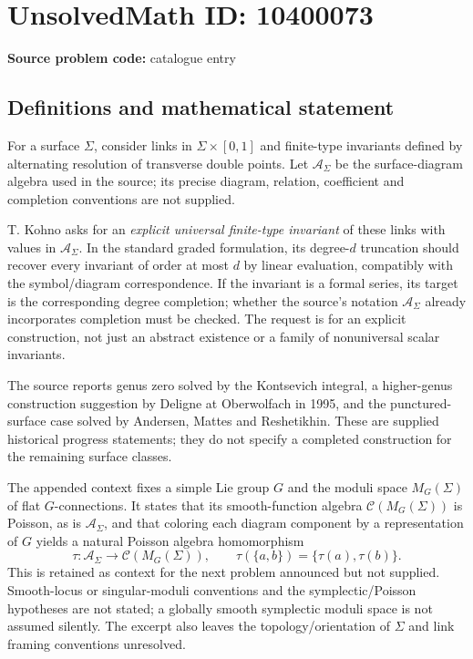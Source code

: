 \documentclass[11pt]{article}
\begin{document}
\section*{UnsolvedMath ID: 10400073}
\textbf{Source problem code:} catalogue entry
\subsection{Definitions and mathematical statement}
For a surface \(\Sigma\), consider links in \(\Sigma\times[0,1]\) and finite-type invariants defined by alternating resolution of transverse double points. Let \(\mathcal A_\Sigma\) be the surface-diagram algebra used in the source; its precise diagram, relation, coefficient and completion conventions are not supplied.

T. Kohno asks for an \emph{explicit universal finite-type invariant} of these links with values in \(\mathcal A_\Sigma\). In the standard graded formulation, its degree-\(d\) truncation should recover every invariant of order at most \(d\) by linear evaluation, compatibly with the symbol/diagram correspondence. If the invariant is a formal series, its target is the corresponding degree completion; whether the source's notation \(\mathcal A_\Sigma\) already incorporates completion must be checked. The request is for an explicit construction, not just an abstract existence or a family of nonuniversal scalar invariants.

The source reports genus zero solved by the Kontsevich integral, a higher-genus construction suggestion by Deligne at Oberwolfach in 1995, and the punctured-surface case solved by Andersen, Mattes and Reshetikhin. These are supplied historical progress statements; they do not specify a completed construction for the remaining surface classes.

The appended context fixes a simple Lie group \(G\) and the moduli space \(M_G(\Sigma)\) of flat \(G\)-connections. It states that its smooth-function algebra \(\mathcal C(M_G(\Sigma))\) is Poisson, as is \(\mathcal A_\Sigma\), and that coloring each diagram component by a representation of \(G\) yields a natural Poisson algebra homomorphism
\[
 \tau:\mathcal A_\Sigma\longrightarrow\mathcal C(M_G(\Sigma)),\qquad
 \tau(\{a,b\})=\{\tau(a),\tau(b)\}.
\]
This is retained as context for the next problem announced but not supplied. Smooth-locus or singular-moduli conventions and the symplectic/Poisson hypotheses are not stated; a globally smooth symplectic moduli space is not assumed silently. The excerpt also leaves the topology/orientation of \(\Sigma\) and link framing conventions unresolved.
\end{document}
